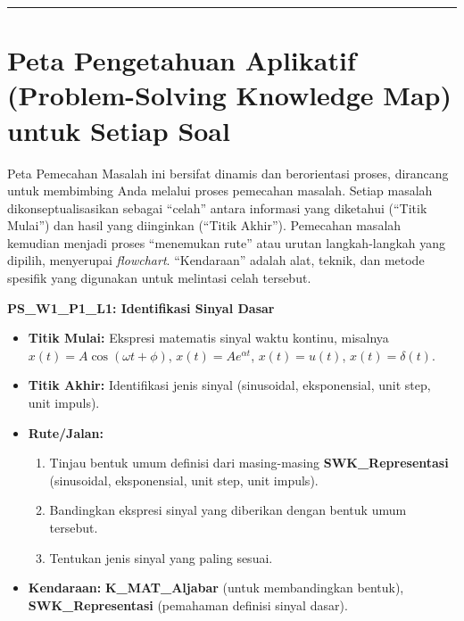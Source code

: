 \documentclass[
  letterpaper,
  DIV=11,
  numbers=noendperiod]{scrreprt}
\providecommand{\tightlist}{%
  \setlength{\itemsep}{0pt}\setlength{\parskip}{0pt}}\usepackage{longtable,booktabs,array}
\begin{document}
\begin{center}\rule{0.5\linewidth}{0.5pt}\end{center}

\section{Peta Pengetahuan Aplikatif (Problem-Solving Knowledge Map)
untuk Setiap
Soal}\label{peta-pengetahuan-aplikatif-problem-solving-knowledge-map-untuk-setiap-soal}

Peta Pemecahan Masalah ini bersifat dinamis dan berorientasi proses,
dirancang untuk membimbing Anda melalui proses pemecahan masalah. Setiap
masalah dikonseptualisasikan sebagai ``celah'' antara informasi yang
diketahui (``Titik Mulai'') dan hasil yang diinginkan (``Titik Akhir'').
Pemecahan masalah kemudian menjadi proses ``menemukan rute'' atau urutan
langkah-langkah yang dipilih, menyerupai \emph{flowchart}. ``Kendaraan''
adalah alat, teknik, dan metode spesifik yang digunakan untuk melintasi
celah tersebut.

\textbf{PS\_W1\_P1\_L1: Identifikasi Sinyal Dasar}

\begin{itemize}
\tightlist
\item
  \textbf{Titik Mulai:} Ekspresi matematis sinyal waktu kontinu,
  misalnya \(x(t) = A \cos(\omega t + \phi)\),
  \(x(t) = A e^{\alpha t}\), \(x(t) = u(t)\), \(x(t) = \delta(t)\).
\item
  \textbf{Titik Akhir:} Identifikasi jenis sinyal (sinusoidal,
  eksponensial, unit step, unit impuls).
\item
  \textbf{Rute/Jalan:}

  \begin{enumerate}
  \def\labelenumi{\arabic{enumi}.}
  \tightlist
  \item
    Tinjau bentuk umum definisi dari masing-masing
    \textbf{SWK\_Representasi} (sinusoidal, eksponensial, unit step,
    unit impuls).
  \item
    Bandingkan ekspresi sinyal yang diberikan dengan bentuk umum
    tersebut.
  \item
    Tentukan jenis sinyal yang paling sesuai.
  \end{enumerate}
\item
  \textbf{Kendaraan:} \textbf{K\_MAT\_Aljabar} (untuk membandingkan
  bentuk), \textbf{SWK\_Representasi} (pemahaman definisi sinyal dasar).
\end{itemize}
\end{document}
